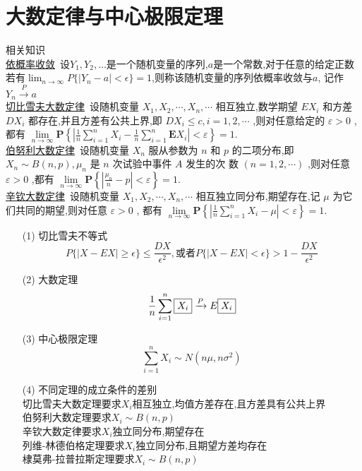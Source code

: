 \documentclass[12pt, a4paper, oneside, UTF8]{ctexbook}
\begin{document}
% 
\else
\fi

\chapter{大数定律与中心极限定理}
\begin{remark}
    相关知识 \\
    \underline{依概率收敛}\ 设$Y_1,Y_2,\ldots$是一个随机变量的序列,$a$是一个常数,对于任意的给定正数
    若有$\lim_{n\to\infty}P\{\left|Y_n-a\right|<\epsilon\}=1$,则称该随机变量的序列依概率收敛与$a$,
    记作$Y_n\xrightarrow{P}a$ \\
    \underline{切比雪夫大数定律}\ 
    设随机变量 ${X}_{1},{X}_{2},\cdots ,{X}_{n},\cdots$ 相互独立,数学期望 $E{X}_{i}$ 和方差 $D{X}_{i}$ 都存在,并且方差有公共上界,即
    $D{X}_{i} \leq  c,i = 1,2,\cdots$ ,则对任意给定的 $\varepsilon  > 0$ ,都有
    $\mathop{\lim }\limits_{{n \rightarrow  \infty }}\mathbf{P}\left\{  {\left| {\frac{1}{n}\mathop{\sum }\limits_{{i = 1}}^{n}{X}_{i} - \frac{1}{n}\mathop{\sum }\limits_{{i = 1}}^{n}\mathbf{E}{X}_{i}}\right|  < \varepsilon }\right\}   = 1.$ \\
    \underline{伯努利大数定律}\ 
    设随机变量 ${X}_{n}$ 服从参数为 $n$ 和 $p$ 的二项分布,即 ${X}_{n} \sim  B\left( {n,p}\right) ,{\mu }_{n}$ 是 $n$ 次试验中事件 $A$ 发生的次
    数 $\left( {n = 1,2,\cdots }\right)$ ,则对任意 $\varepsilon  > 0$ ,都有
    $\mathop{\lim }\limits_{{n \rightarrow  \infty }}\mathbf{P}\left\{  {\left| {\frac{{\mu }_{n}}{n} - p}\right|  < \varepsilon }\right\}   = 1.$ \\
    \underline{辛钦大数定律}\ 
    设随机变量 ${X}_{1},{X}_{2},\cdots ,{X}_{n},\cdots$ 相互独立同分布,期望存在,记 $\mu$ 为它们共同的期望,则对任意 $\varepsilon  > 0$ ,
    都有
    $\mathop{\lim }\limits_{{n \rightarrow  \infty }}\mathbf{P}\left\{  {\left| {\frac{1}{n}\mathop{\sum }\limits_{{i = 1}}^{n}{X}_{i} - \mu }\right|  < \varepsilon }\right\}   = 1.$
\end{remark}
\begin{remark}[主要考法]
    \begin{enumerate}
    \item[(1)] 切比雪夫不等式 
    \[
    P\{\left|X-EX\right|\geq\epsilon\}\leq \frac{DX}{\epsilon^2},
    \text{或者}P\{\left|X-EX\right| < \epsilon\}>1-\frac{DX}{\epsilon^2}
    \]
    \item[(2)] 大数定理 
    \[
    \frac{1}{n}\sum_{i=1}^{n}\fbox{$X_i$}\xrightarrow{P}E\fbox{$X_i$}
    \]
    \item[(3)] 中心极限定理
    \[
    \sum_{i=1}^{n}X_i\sim N(n\mu,n\sigma^2)
    \]
    \item[(4)]不同定理的成立条件的差别  \\
    切比雪夫大数定理要求$X_i$相互独立,均值方差存在,且方差具有公共上界 \\
    伯努利大数定理要求$X_i\sim B(n,p)$ \\
    辛钦大数定律要求$X_i$独立同分布,期望存在 \\
    列维-林德伯格定理要求$X_i$独立同分布,且期望方差均存在 \\
    棣莫弗-拉普拉斯定理要求$X_i\sim B(n,p)$
    \end{enumerate}
\end{remark}
\end{document}
